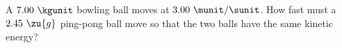 A $7.00\ \kgunit$ bowling ball moves at $3.00\ \munit/\sunit$. How
fast must a $2.45\ \zu{g}$ ping-pong ball move so that the two balls
have the same kinetic energy?\answercheck
